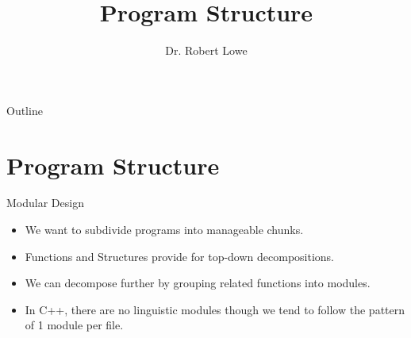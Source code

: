\documentclass[]{beamer}
\title{Program Structure}
\author{Dr. Robert Lowe\\}
\institute[Pellissippi State Community College] %
{
  Department of Computer Information Technology
  Pellissippi State Community College
}
\date[]{}
\begin{document}
\begin{frame}
  \titlepage
\end{frame}

\begin{frame}{Outline}
  \tableofcontents
\end{frame}




\section{Program Structure}

\begin{frame}{Modular Design}
    \begin{itemize}[<+->]
        \item We want to subdivide programs into manageable chunks.
        \item Functions and Structures provide for top-down
            decompositions.
        \item We can decompose further by grouping related functions
            into modules.
        \item In C++, there are no linguistic modules though we tend
            to follow the pattern of 1 module per file.
    \end{itemize}
\end{frame}
\end{document}
